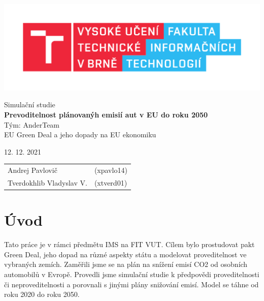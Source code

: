 \documentclass[a4paper, 11pt]{article}
\begin{document}
	\begin{titlepage}
		\begin{center}
			\includegraphics[width=0.8 \linewidth]{FIT_logo.pdf}


			\Huge{Simulační studie} \\
			\LARGE{\textbf{Prevoditelnost plánovanýh emisií aut v EU do roku 2050}} \\
			\Large{Tým: AnderTeam} \\
			\Large{EU Green Deal a jeho dopady na EU ekonomiku}

		\end{center}

		\begin{minipage}{0.5 \textwidth}
			\Large
			12. 12. 2021
		\end{minipage}
		\hfill
		\begin{minipage}[r]{0.5 \textwidth}
			\Large
			\begin{tabular}{ll}
			    Andrej Pavlovič & (xpavlo14) \\
				Tverdokhlib Vladyslav V. & (xtverd01)
			\end{tabular}
		\end{minipage}
	\end{titlepage}
	\clearpage

	\setcounter{page}{1}
	\tableofcontents
	\clearpage


	\section{Úvod}
    Tato práce je v rámci předmětu IMS na FIT VUT. Cílem bylo prostudovat pakt Green Deal, jeho dopad na různé aspekty státu a modelovat proveditelnost ve vybraných zemích.
    Zaměřili jsme se na plán na snížení emisí CO2 od osobních automobilů v Evropě. Provedli jsme simulační studie k předpovědi proveditelnosti či neproveditelnosti a porovnali s jinými plány snižování emisí. Model se táhne od roku 2020 do roku 2050.
\end{document}
